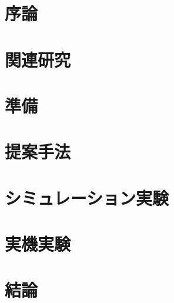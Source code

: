 \documentclass[12pt,dvipdfmx]{jarticle}
\begin{document}
\titlepage
\cmemberspage


\firstabstract \secondabstract
\toc \newpage
\listoffigures \listoftables \newpage
{}

\section{序論} \label{sec: intro}
 \newpage

\section{関連研究} \label{sec: rel_work}
 \newpage

\section{準備} \label{sec: prelim}
 \newpage

\section{提案手法} \label{sec: proposal}
 \newpage

\section{シミュレーション実験} \label{sec: sim_exp}
 \newpage

\section{実機実験} \label{sec: real_exp}
 \newpage

\section{結論} \label{sec: concl}
 \newpage
\acknowledgements
 \newpage


\appendix

\end{document}
